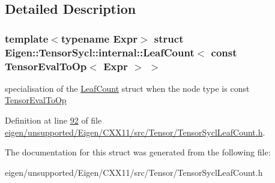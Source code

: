 \subsection{Detailed Description}
\subsubsection*{template$<$typename Expr$>$\newline
struct Eigen\+::\+Tensor\+Sycl\+::internal\+::\+Leaf\+Count$<$ const Tensor\+Eval\+To\+Op$<$ Expr $>$ $>$}

specialisation of the \hyperlink{struct_eigen_1_1_tensor_sycl_1_1internal_1_1_leaf_count}{Leaf\+Count} struct when the node type is const \hyperlink{class_eigen_1_1_tensor_eval_to_op}{Tensor\+Eval\+To\+Op} 

Definition at line \hyperlink{eigen_2unsupported_2_eigen_2_c_x_x11_2src_2_tensor_2_tensor_sycl_leaf_count_8h_source_l00092}{92} of file \hyperlink{eigen_2unsupported_2_eigen_2_c_x_x11_2src_2_tensor_2_tensor_sycl_leaf_count_8h_source}{eigen/unsupported/\+Eigen/\+C\+X\+X11/src/\+Tensor/\+Tensor\+Sycl\+Leaf\+Count.\+h}.



The documentation for this struct was generated from the following file\+:\begin{DoxyCompactItemize}
\item 
eigen/unsupported/\+Eigen/\+C\+X\+X11/src/\+Tensor/\+Tensor\+Sycl\+Leaf\+Count.\+h\end{DoxyCompactItemize}
